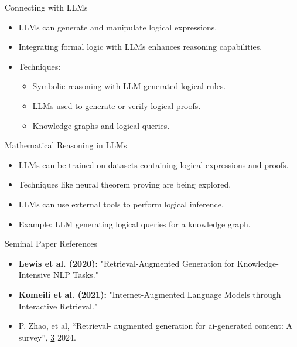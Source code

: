 \begin{frame}{Connecting with LLMs}
    \begin{itemize}
        \item LLMs can generate and manipulate logical expressions.
        \item Integrating formal logic with LLMs enhances reasoning capabilities.
        \item Techniques:
        \begin{itemize}
            \item Symbolic reasoning with LLM generated logical rules.
            \item LLMs used to generate or verify logical proofs.
            \item Knowledge graphs and logical queries.
        \end{itemize}
    \end{itemize}
\end{frame}

\begin{frame}{Mathematical Reasoning in LLMs}
    \begin{itemize}
        \item LLMs can be trained on datasets containing logical expressions and proofs.
        \item Techniques like neural theorem proving are being explored.
        \item LLMs can use external tools to perform logical inference.
        \item Example: LLM generating logical queries for a knowledge graph.
    \end{itemize}
\end{frame}


\begin{frame}{Seminal Paper References}
  \begin{itemize}
    \item \textbf{Lewis et al. (2020):} "Retrieval-Augmented Generation for Knowledge-Intensive NLP Tasks." \cite{lewis2020retrieval}
    \item \textbf{Komeili et al. (2021):} "Internet-Augmented Language Models through Interactive Retrieval." \cite{komeili2021internet}
    \item P. Zhao, et al,  ``Retrieval-
    augmented generation for ai-generated content: A survey'', \href{https://arxiv.org/abs/2402.19473}{3} 2024.
  \end{itemize}
\end{frame}


